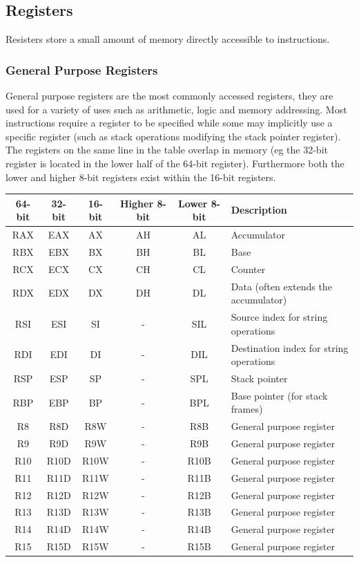 \documentclass{article}
\newcommand{\layout}[1]{\parbox{\linewidth}{#1}}
\begin{document}
\layout{
  \subsection{Registers}

  Resisters store a small amount of memory directly accessible to instructions.
}

\layout{
  \subsubsection{General Purpose Registers}

  General purpose registers are the most commonly accessed registers, they are used for a variety of uses such as arithmetic, logic and memory addressing.
  Most instructions require a register to be specified while some may implicitly use a specific register (such as stack operations modifying the stack pointer register).
  The registers on the same line in the table overlap in memory (eg the 32-bit register is located in the lower half of the 64-bit register).
  Furthermore both the lower and higher 8-bit registers exist within the 16-bit registers.
}

\begin{table}[H]
  \centering
  \begin{tabular}{|c|c|c|c|c|l|}
    \hline \textbf{64-bit} & \textbf{32-bit} & \textbf{16-bit} & \textbf{Higher 8-bit} & \textbf{Lower 8-bit} & \textbf{Description} \\ \hline
    RAX & EAX & AX & AH & AL & Accumulator \\
    RBX & EBX & BX & BH & BL & Base \\
    RCX & ECX & CX & CH & CL & Counter \\
    RDX & EDX & DX & DH & DL & Data (often extends the accumulator) \\
    RSI & ESI & SI & - & SIL & Source index for string operations \\
    RDI & EDI & DI & - & DIL & Destination index for string operations \\
    RSP & ESP & SP & - & SPL & Stack pointer \\
    RBP & EBP & BP & - & BPL & Base pointer (for stack frames) \\
    R8 & R8D & R8W & - & R8B & General purpose register \\
    R9 & R9D & R9W & - & R9B & General purpose register \\
    R10 & R10D & R10W & - & R10B & General purpose register \\
    R11 & R11D & R11W & - & R11B & General purpose register \\
    R12 & R12D & R12W & - & R12B & General purpose register \\
    R13 & R13D & R13W & - & R13B & General purpose register \\
    R14 & R14D & R14W & - & R14B & General purpose register \\
    R15 & R15D & R15W & - & R15B & General purpose register \\ \hline
  \end{tabular}
\end{table}
\end{document}
